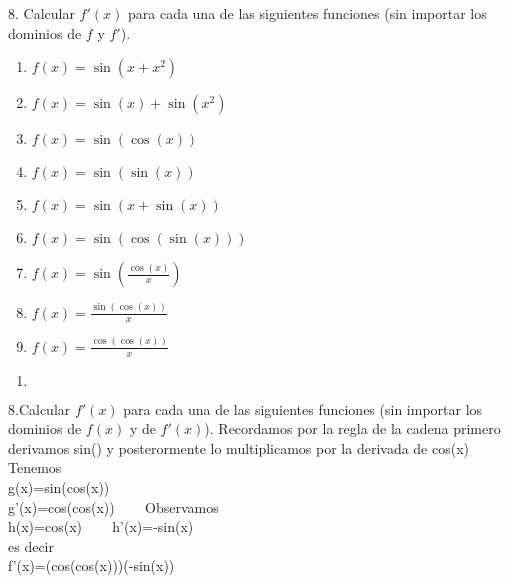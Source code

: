 \documentclass[12pt]{article}
\begin{document}
8. Calcular \(f'(x)\) para cada una de las siguientes funciones (sin importar los dominios de \(f\) y \(f'\)).

\begin{enumerate}[\hspace{12px} a)]
    \item \(f(x) = \sin(x+x^2)\)
    \item \(f(x) = \sin(x) + \sin(x^2)\)
    \item \(f(x) = \sin(\cos(x))\)
    \item \(f(x) = \sin(\sin(x))\)
    \item \(f(x) = \sin(x+\sin(x))\)
    \item \(f(x) = \sin(\cos(\sin(x)))\)
    \item \(f(x) = \sin\left(\displaystyle\frac{\cos(x)}{x}\right)\)
    \item \(f(x) = \displaystyle\frac{\sin(\cos(x))}{x}\)
    \item \(f(x) = \displaystyle\frac{\cos(\cos(x))}{x}\)
\end{enumerate}


\begin{enumerate}[\hspace{12px} a)]
    \item \(\)
\end{enumerate}

\vfill

8.Calcular $f'(x)$ para cada una de las siguientes funciones (sin importar los dominios de $f(x)$ y de $f'(x)$).
        Recordamos por la regla de la cadena primero derivamos sin() y posterormente lo multiplicamos por la derivada de cos(x)\\
        Tenemos\\
        g(x)=sin(cos(x))\\
        g'(x)=cos(cos(x)) \ \ \  %
        Observamos\\
        h(x)=cos(x)  \ \ \ %
        h'(x)=-sin(x)\\
        es decir\\
        f'(x)=(cos(cos(x)))(-sin(x)) \ \ \ %
\end{document}
